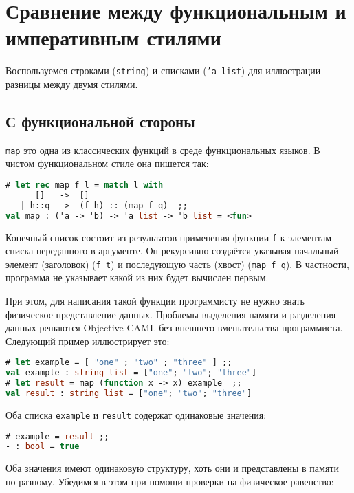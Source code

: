 \section{Сравнение между функциональным и императивным стилями}
\label{sec:comparison_between_functional_and_imperative}

Воспользуемся строками (\texttt{string}) и списками (\texttt{'a list}) для
иллюстрации разницы между двумя стилями.

\subsection{С функциональной стороны}
\label{subsec:the_functional_side}

\texttt{map} это одна из классических функций в среде функциональных языков. В
чистом функциональном стиле она пишется так:

\begin{lstlisting}[language=OCaml]
# let rec map f l = match l with
      []   ->  []
   | h::q  ->  (f h) :: (map f q)  ;;
val map : ('a -> 'b) -> 'a list -> 'b list = <fun>
\end{lstlisting}

Конечный список состоит из результатов применения функции \texttt{f} к элементам
списка переданного в аргументе. Он рекурсивно создаётся указывая начальный
элемент (заголовок) (\texttt{f t}) и последующую часть (хвост) (\texttt{map f
q}). В частности, программа не указывает какой из них будет вычислен первым.

При этом, для написания такой функции программисту не нужно знать физическое
представление данных. Проблемы выделения памяти и разделения данных решаются
Objective CAML без внешнего вмешательства программиста. Следующий пример
иллюстрирует это:

\begin{lstlisting}[language=OCaml]
# let example = [ "one" ; "two" ; "three" ] ;;
val example : string list = ["one"; "two"; "three"]
# let result = map (function x -> x) example  ;;
val result : string list = ["one"; "two"; "three"]
\end{lstlisting}

Оба списка \texttt{example} и \texttt{result} содержат одинаковые значения:

\begin{lstlisting}[language=OCaml]
# example = result ;;
- : bool = true
\end{lstlisting}

Оба значения имеют одинаковую структуру, хоть они и представлены в памяти по
разному. Убедимся в этом при помощи проверки на физическое равенство:

